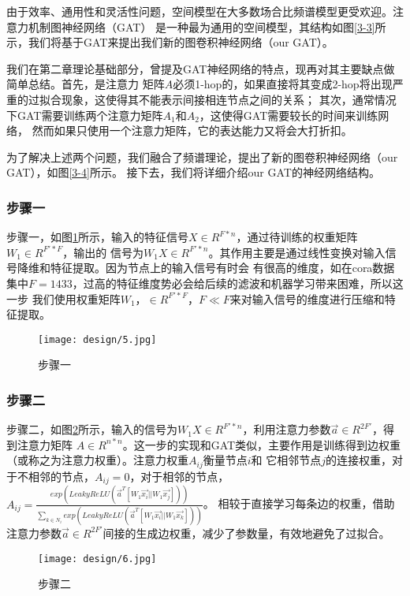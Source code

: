 由于效率、通用性和灵活性问题，空间模型在大多数场合比频谱模型更受欢迎。注意力机制图神经网络（GAT）
是一种最为通用的空间模型，其结构如图\ref{3-3}所示，我们将基于GAT来提出我们新的图卷积神经网络（our GAT）。

我们在第二章理论基础部分，曾提及GAT神经网络的特点，现再对其主要缺点做简单总结。首先，是注意力
矩阵$A$必须1-hop的，如果直接将其变成2-hop将出现严重的过拟合现象，这使得其不能表示间接相连节点之间的关系；
其次，通常情况下GAT需要训练两个注意力矩阵$A_1$和$A_2$，这使得GAT需要较长的时间来训练网络，
然而如果只使用一个注意力矩阵，它的表达能力又将会大打折扣。

为了解决上述两个问题，我们融合了频谱理论，提出了新的图卷积神经网络（our GAT），如图\ref{3-4}所示。
接下去，我们将详细介绍our GAT的神经网络结构。

\subsubsection{步骤一}
步骤一，如图\ref{3-5}所示，输入的特征信号$ X \in R^{F*n} $，通过待训练的权重矩阵$ W_1 \in R^{F'*F} $，输出的
信号为$ W_{1}X \in R^{F'*n} $。其作用主要是通过线性变换对输入信号降维和特征提取。因为节点上的输入信号有时会
有很高的维度，如在cora数据集中$ F = 1433 $，过高的特征维度势必会给后续的滤波和机器学习带来困难，所以这一步
我们使用权重矩阵$ W_1，\in R^{F'*F}，F \ll F $来对输入信号的维度进行压缩和特征提取。
\begin{figure}[ht]
    \centering
    \texttt{[image: design/5.jpg]}
    \caption{\label{3-5}步骤一}
\end{figure}

\subsubsection{步骤二}
步骤二，如图\ref{3-6}所示，输入的信号为$ W_{1}X \in R^{F'*n} $，利用注意力参数$ \vec{a} \in R^{2F'} $，得到注意力矩阵
$A \in R^{n*n}$。这一步的实现和GAT类似，主要作用是训练得到边权重（或称之为注意力权重）。注意力权重$A_{ij}$衡量节点$i$和
它相邻节点$j$的连接权重，对于不相邻的节点，$A_{ij} = 0$，对于相邻的节点，$ A_{ij} = \frac{exp(LeakyReLU(\vec{a}^{T}[W_{1}\vec{x_{i}}||W_{1}\vec{x_{j}}]))} { {\textstyle \sum_{k\in N_{i} }^{}} exp(LeakyReLU(\vec{a}^{T}[W_{1}\vec{x_{i}}||W_{1}\vec{x_{k}}]))} $。
相较于直接学习每条边的权重，借助注意力参数$ \vec{a} \in R^{2F'} $间接的生成边权重，减少了参数量，有效地避免了过拟合。
\begin{figure}[ht]
    \centering
    \texttt{[image: design/6.jpg]}
    \caption{\label{3-6}步骤二}
\end{figure}

